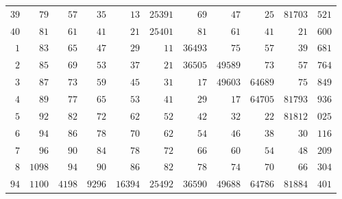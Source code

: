 \begin{longtable}{@{}r|r|r|r|r|r|r|r|r|r|r@{}}
$39$ & $79$ & $57$ & $35$ & $13$ & $25391$ & $69$ & $47$ & $25$ & $81703$ & $521$\\
$40$ & $81$ & $61$ & $41$ & $21$ & $25401$ & $81$ & $61$ & $41$ & $21$ & $600$\\
$1$ & $83$ & $65$ & $47$ & $29$ & $11$ & $36493$ & $75$ & $57$ & $39$ & $681$\\
$2$ & $85$ & $69$ & $53$ & $37$ & $21$ & $36505$ & $49589$ & $73$ & $57$ & $764$\\
$3$ & $87$ & $73$ & $59$ & $45$ & $31$ & $17$ & $49603$ & $64689$ & $75$ & $849$\\
$4$ & $89$ & $77$ & $65$ & $53$ & $41$ & $29$ & $17$ & $64705$ & $81793$ & $936$\\
$5$ & $92$ & $82$ & $72$ & $62$ & $52$ & $42$ & $32$ & $22$ & $81812$ & $025$\\
$6$ & $94$ & $86$ & $78$ & $70$ & $62$ & $54$ & $46$ & $38$ & $30$ & $116$\\
$7$ & $96$ & $90$ & $84$ & $78$ & $72$ & $66$ & $60$ & $54$ & $48$ & $209$\\
$8$ & $1098$ & $94$ & $90$ & $86$ & $82$ & $78$ & $74$ & $70$ & $66$ & $304$\\
$94$ & $1100$ & $4198$ & $9296$ & $16394$ & $25492$ & $36590$ & $49688$ & $64786$ & $81884$ & $401$\\
\hline\end{longtable}\endgroup
\clearpage
\begingroup\fontsize{8.5}{10}\selectfont\setlength{\tabcolsep}{2pt}\renewcommand{\arraystretch}{1}
